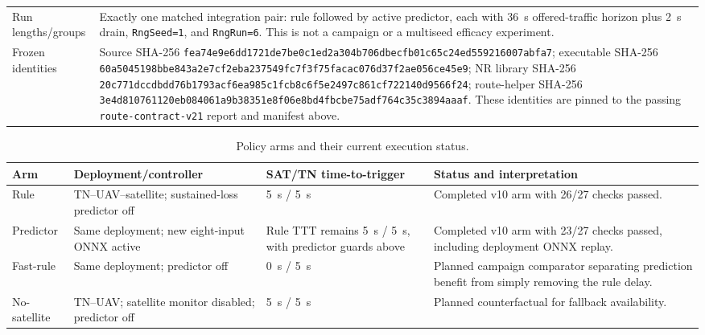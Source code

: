 \begin{table}[t]
\begin{tabular}{p{} p{}}
Run lengths/groups & Exactly one matched integration pair: rule followed by active predictor, each with 36~s offered-traffic horizon plus 2~s drain, \texttt{RngSeed=1}, and \texttt{RngRun=6}.  This is not a campaign or a multiseed efficacy experiment. \\
Frozen identities & Source SHA-256 \texttt{fea74e9e6dd1721d\allowbreak e7be0c1ed2a304b7\allowbreak 06dbecfb01c65c24\allowbreak ed559216007abfa7}; executable SHA-256 \texttt{60a5045198bbe843\allowbreak a2e7cf2eba237549\allowbreak fc7f3f75facac076\allowbreak d37f2ae056ce45e9}; NR library SHA-256 \texttt{20c771dccdbdd76b\allowbreak 1793acf6ea985c1f\allowbreak cb8c6f5e2497c861\allowbreak cf722140d9566f24}; route-helper SHA-256 \texttt{3e4d810761120eb0\allowbreak 84061a9b38351e8f\allowbreak 06e8bd4fbcbe75ad\allowbreak f764c35c3894aaaf}.  These identities are pinned to the passing \texttt{route-\allowbreak contract-\allowbreak v21} report and manifest above. \\
\hline
\end{tabular}
\end{table}

\begin{table}[t]
\centering
\footnotesize
\caption{Policy arms and their current execution status.}
\label{tab:audited_policy_arms}
\begin{tabular}{p{} p{} p{} p{}}
\hline
Arm & Deployment/controller & SAT/TN time-to-trigger & Status and interpretation \\
\hline
Rule & TN--UAV--satellite; sustained-loss predictor off & 5~s / 5~s & Completed v10 arm with 26/27 checks passed. \\
Predictor & Same deployment; new eight-input ONNX active & Rule TTT remains 5~s / 5~s, with predictor guards above & Completed v10 arm with 23/27 checks passed, including deployment ONNX replay. \\
Fast-rule & Same deployment; predictor off & 0~s / 5~s & Planned campaign comparator separating prediction benefit from simply removing the rule delay. \\
No-satellite & TN--UAV; satellite monitor disabled; predictor off & 5~s / 5~s & Planned counterfactual for fallback availability. \\
\hline
\end{tabular}
\end{table}

